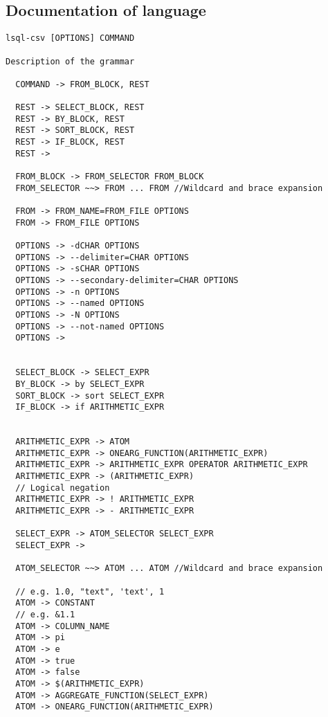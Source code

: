 \subsection{Documentation of language}
\begin{verbatim}
lsql-csv [OPTIONS] COMMAND
      
Description of the grammar
  
  COMMAND -> FROM_BLOCK, REST
                            
  REST -> SELECT_BLOCK, REST 
  REST -> BY_BLOCK, REST   
  REST -> SORT_BLOCK, REST 
  REST -> IF_BLOCK, REST   
  REST ->
  
  FROM_BLOCK -> FROM_SELECTOR FROM_BLOCK
  FROM_SELECTOR ~~> FROM ... FROM //Wildcard and brace expansion
  
  FROM -> FROM_NAME=FROM_FILE OPTIONS
  FROM -> FROM_FILE OPTIONS
  
  OPTIONS -> -dCHAR OPTIONS
  OPTIONS -> --delimiter=CHAR OPTIONS
  OPTIONS -> -sCHAR OPTIONS
  OPTIONS -> --secondary-delimiter=CHAR OPTIONS
  OPTIONS -> -n OPTIONS  
  OPTIONS -> --named OPTIONS
  OPTIONS -> -N OPTIONS   
  OPTIONS -> --not-named OPTIONS
  OPTIONS ->
  
  
  SELECT_BLOCK -> SELECT_EXPR
  BY_BLOCK -> by SELECT_EXPR
  SORT_BLOCK -> sort SELECT_EXPR                                                                                                                              
  IF_BLOCK -> if ARITHMETIC_EXPR
  
                                                                                                                 
  ARITHMETIC_EXPR -> ATOM  
  ARITHMETIC_EXPR -> ONEARG_FUNCTION(ARITHMETIC_EXPR)                                                                                                                                            
  ARITHMETIC_EXPR -> ARITHMETIC_EXPR OPERATOR ARITHMETIC_EXPR
  ARITHMETIC_EXPR -> (ARITHMETIC_EXPR)
  // Logical negation
  ARITHMETIC_EXPR -> ! ARITHMETIC_EXPR
  ARITHMETIC_EXPR -> - ARITHMETIC_EXPR
  
  SELECT_EXPR -> ATOM_SELECTOR SELECT_EXPR                                                                                                                                     
  SELECT_EXPR ->
  
  ATOM_SELECTOR ~~> ATOM ... ATOM //Wildcard and brace expansion
  
  // e.g. 1.0, "text", 'text', 1
  ATOM -> CONSTANT
  // e.g. &1.1
  ATOM -> COLUMN_NAME
  ATOM -> pi   
  ATOM -> e
  ATOM -> true
  ATOM -> false
  ATOM -> $(ARITHMETIC_EXPR)
  ATOM -> AGGREGATE_FUNCTION(SELECT_EXPR)
  ATOM -> ONEARG_FUNCTION(ARITHMETIC_EXPR)


\end{verbatim}
